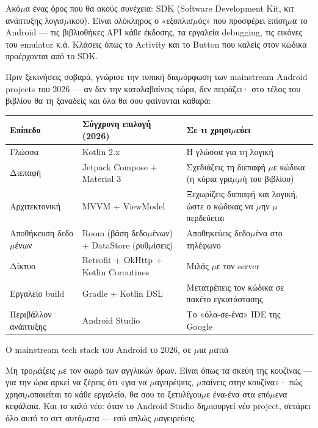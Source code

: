 Ακό$\mu$α ένας όρος που θα ακούς συνέχεια: SDK (Software Development Kit, κιτ ανάπτυξης λογισ$\mu$ικού). Είναι ολόκληρος ο «εξοπλισ$\mu$ός» που προσφέρει επίση$\mu$α το Android — τις βιβλιοθήκες API κάθε έκδοσης, τα εργαλεία debugging, τις εικόνες του emulator κ.ά. Κλάσεις όπως το Activity και το Button που καλείς στον κώδικα προέρχονται από το SDK.


Πριν ξεκινήσεις σοβαρά, γνώρισε την τυπική δια$\mu$όρφωση των mainstream Android projects του 2026 — αν δεν την καταλαβαίνεις τώρα, δεν πειράζει· στο τέλος του βιβλίου θα τη ξαναδείς και όλα θα σου φαίνονται καθαρά:

\begin{center}
\begin{tabularx}{\linewidth}{|X|X|X|}
\hline
\textbf{Επίπεδο} & \textbf{Σύγχρονη επιλογή (2026)} & \textbf{Σε τι χρησι$\mu$εύει} \tabularnewline
\hline
Γλώσσα & Kotlin 2.x & Η γλώσσα για τη λογική \tabularnewline
Διεπαφή & Jetpack Compose + Material 3 & Σχεδιάζεις τη διεπαφή $\mu$ε κώδικα (η κύρια γρα$\mu$$\mu$ή του βιβλίου) \tabularnewline
Αρχιτεκτονική & MVVM + ViewModel & Ξεχωρίζεις διεπαφή και λογική, ώστε ο κώδικας να $\mu$ην $\mu$περδεύεται \tabularnewline
Αποθήκευση δεδο$\mu$ένων & Room (βάση δεδο$\mu$ένων) + DataStore (ρυθ$\mu$ίσεις) & Αποθηκεύεις δεδο$\mu$ένα στο τηλέφωνο \tabularnewline
Δίκτυο & Retrofit + OkHttp + Kotlin Coroutines & Μιλάς $\mu$ε τον server \tabularnewline
Εργαλείο build & Gradle + Kotlin DSL & Μετατρέπεις τον κώδικα σε πακέτο εγκατάστασης \tabularnewline
Περιβάλλον ανάπτυξης & Android Studio & Το «όλα-σε-ένα» IDE της Google \tabularnewline
\hline
\end{tabularx}
\end{center}

\begin{center}\small\color{gray}Ο mainstream tech stack του Android το 2026, σε $\mu$ια $\mu$ατιά\end{center}

Μη τρο$\mu$άζεις $\mu$ε τον σωρό των αγγλικών όρων. Είναι όπως τα σκεύη της κουζίνας — για την ώρα αρκεί να ξέρεις ότι «για να $\mu$αγειρέψεις, $\mu$παίνεις στην κουζίνα»· πώς χρησι$\mu$οποιείται το κάθε εργαλείο, θα σου το ξετυλίγου$\mu$ε ένα-ένα στα επό$\mu$ενα κεφάλαια. Και το καλό νέο: όταν το Android Studio δη$\mu$ιουργεί νέο project, σετάρει όλο αυτό το σετ αυτό$\mu$ατα — εσύ απλώς $\mu$αγειρεύεις.


